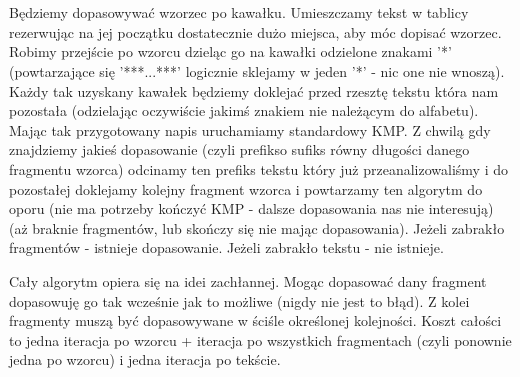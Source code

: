 \documentclass[a4paper,12pt]{article}
\begin{document}
\section{}
\section{}
Będziemy dopasowywać wzorzec po kawałku. Umieszczamy tekst w tablicy rezerwując na jej początku dostatecznie dużo miejsca, aby móc dopisać wzorzec. Robimy przejście po wzorcu dzieląc go na kawałki odzielone znakami '*' (powtarzające się '***...***' logicznie sklejamy w jeden '*' - nic one nie wnoszą). Każdy tak uzyskany kawałek będziemy doklejać przed rzesztę tekstu która nam pozostała (odzielając oczywiście jakimś znakiem nie należącym do alfabetu). Mając tak przygotowany napis uruchamiamy standardowy KMP. Z chwilą gdy znajdziemy jakieś dopasowanie (czyli prefikso sufiks równy długości danego fragmentu wzorca) odcinamy ten prefiks tekstu który już przeanalizowaliśmy i do pozostałej doklejamy kolejny fragment wzorca i powtarzamy ten algorytm do oporu (nie ma potrzeby kończyć KMP - dalsze dopasowania nas nie interesują) (aż braknie fragmentów, lub skończy się nie mając dopasowania). Jeżeli zabrakło fragmentów - istnieje dopasowanie. Jeżeli zabrakło tekstu - nie istnieje.

Cały algorytm opiera się na idei zachłannej. Mogąc dopasować dany fragment dopasowuję go tak wcześnie jak to możliwe (nigdy nie jest to błąd). Z kolei fragmenty muszą być dopasowywane w ściśle określonej kolejności. Koszt całości to jedna iteracja po wzorcu + iteracja po wszystkich fragmentach (czyli ponownie jedna po wzorcu) i jedna iteracja po tekście.
\end{document}
